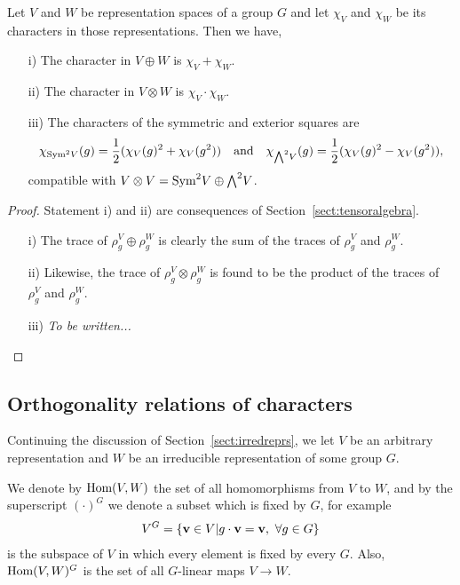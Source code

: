 \begin{proposition}\label{prop:charplustimes}
	Let $V$ and $W$ be representation spaces of a group $G$ and let $\chi_V$ and $\chi_W$ be its characters in those representations. Then we have,
	\begin{enumerate}
		\item[i)] The character in $V \oplus W$ is $\chi_V+\chi_W$.
		\item[ii)] The character in $V \otimes W$ is $\chi_V \cdot \chi_W$.
		\item[iii)] The characters of the symmetric and exterior squares are \begin{align*}
			\chi_{\text{Sym}^2 V}(g) = \frac{1}{2}(\chi_V(g)^2 + \chi_V(g^2)) \quad \text{and} \quad \chi_{{\bigwedge}^2 V}(g) = \frac{1}{2}(\chi_V(g)^2 - \chi_V(g^2)),
		\end{align*} compatible with $V \otimes V = \text{Sym}^2 V \oplus {\bigwedge}^2 V$.
	\end{enumerate}
\end{proposition}
\begin{proof}
	Statement i) and ii) are consequences of Section~\ref{sect:tensoralgebra}. 
	\begin{enumerate}
		\item[i)] The trace of $\rho_g^V \oplus \rho_g^W$ is clearly the sum of the traces of $\rho_g^V$ and $\rho_g^W$.
		\item[ii)] Likewise, the trace of $\rho_g^V \otimes \rho_g^W$ is found to be the product of the traces of $\rho_g^V$ and $\rho_g^W$.
		\item[iii)] \textit{To be written...} \qedhere
	\end{enumerate}
\end{proof}


\subsection{Orthogonality relations of characters}

Continuing the discussion of Section~\ref{sect:irredreprs}, we let $V$ be an arbitrary representation and $W$ be an irreducible representation of some group $G$. 

We denote by $\text{Hom} (V,W)$ the set of all homomorphisms from $V$ to $W$, and by the superscript $(\cdot) ^G$ we denote a subset which is fixed by $G$, for example 
\begin{align}\label{eq:defVG}
	V^G = \left\lbrace \vvec \in V \middle\vert g\cdot \vvec = \vvec, \ \forall g \in G \right\rbrace
\end{align} 
is the subspace of $V$ in which every element is fixed by every $G$. Also, $\text{Hom}(V,W)^G$ is the set of all $G$-linear maps $V \rightarrow W$.

